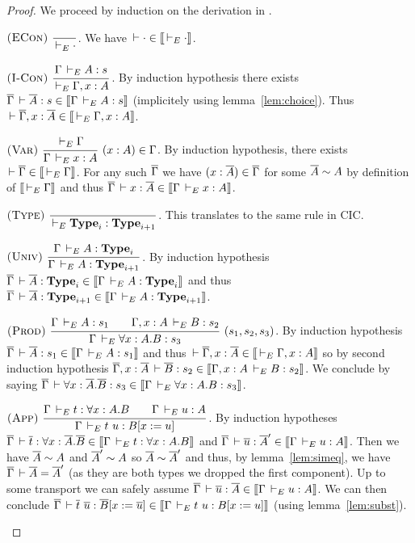 \documentclass[11pt]{article}
\theoremstyle{plain}
\theoremstyle{remark}
\begin{document}
\begin{proof}
  We proceed by induction on the derivation in \CCe.
  \begin{caselist}
    \nextcase $\nmru{ECon}{}{\dere \cdot}$.
    We have $\der \cdot \in \den{\dere \cdot}$.

    \nextcase
    \(
    \nmru{I-Con%
        }{\Gamma \dere A : s
        }{\dere \Gamma, x:A}
    \).
    By induction hypothesis there exists
    $\barG \der \barA : s \in \den{\Gamma \dere A : s}$ (implicitely using
    lemma~\ref{lem:choice}). Thus
    $\der \barG, x:\barA \in \den{\dere \Gamma, x:A}$.

    \nextcase
    \(
      \nmrux{Var%
           }{\dere \Gamma
           }{\Gamma \dere x : A
           }{(x : A) \in \Gamma}
    \).
    By induction hypothesis, there exists $\der \barG \in \den{\dere \Gamma}$.
    For any such $\barG$ we have $(x : \barA) \in \barG$ for some $\barA \sim A$
    by definition of $\den{\dere \Gamma}$ and thus
    $\barG \der x : \barA \in \den{\Gamma \dere x : A}$.

    \nextcase \(\nmru{Type}{}{\dere \Type_i : \Type_{i+1}}\).
    This translates to the same rule in CIC.

    \nextcase \(
      \nmru{Univ%
          }{\Gamma \dere A : \Type_i
          }{\Gamma \dere A : \Type_{i+1}}
    \).
    By induction hypothesis
    $\barG \der \barA : \Type_i \in \den{\Gamma \dere A : \Type_i}$
    and thus
    $\barG \der \barA : \Type_{i+1} \in \den{\Gamma \dere A : \Type_{i+1}}$.

    \nextcase \(
      \nmrux{Prod%
           }{\Gamma \dere A : s_1 \qquad
             \Gamma, x:A \dere B : s_2
           }{\Gamma \dere \forall x:A.B : s_3
           }{(s_1,s_2,s_3)}
    \).
    By induction hypothesis
    $\barG \der \barA : s_1 \in \den{\Gamma \dere A : s_1}$ and
    thus $\der \barG, x:\barA \in \den{\dere \Gamma, x:A}$ so by second
    induction hypothesis
    $\barG, x:\barA \der \barB : s_2 \in \den{\Gamma, x:A \dere B : s_2}$.
    We conclude by saying
    $\barG \der \forall x:\barA.\barB : s_3
    \in \den{\Gamma \dere \forall x:A.B : s_3}$.

    \nextcase \(
      \nmru{App%
          }{\Gamma \dere t : \forall x:A.B \qquad
            \Gamma \dere u : A
          }{\Gamma \dere t\ u : B[x := u]}
    \).
    By induction hypotheses
    $\barG \der \bart : \forall x:\barA.\barB \in
    \den{\Gamma \dere t : \forall x:A.B}$ and
    $\barG \der \baru : \barA' \in \den{\Gamma \dere u : A}$.
    Then we have $\barA \sim A$ and $\barA' \sim A$ so $\barA \sim \barA'$
    and thus, by lemma~\ref{lem:simeq}, we have $\barG \der \barA = \barA'$
    (as they are both types we dropped the first component).
    Up to some transport we can safely assume
    $\barG \der \baru : \barA \in \den{\Gamma \dere u : A}$.
    We can then conclude
    $\barG \der \bart\ \baru : \barB[x := \baru] \in
    \den{\Gamma \dere t\ u : B[x := u]}$ (using lemma~\ref{lem:subst}).


\end{caselist}
\end{proof}
\end{document}
